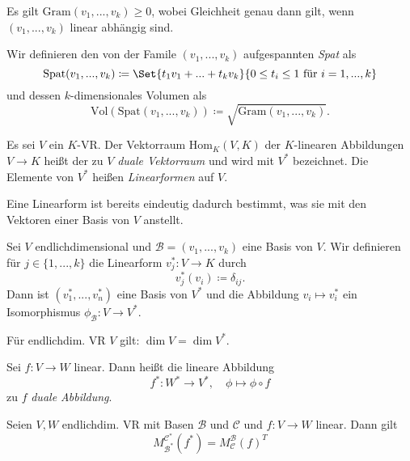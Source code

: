 \documentclass{cheat-sheet}
\newcommand{\Gram}{\mathrm{Gram}}
\newcommand{\Spat}{\mathrm{Spat}}
\newcommand{\Vol}{\mathrm{Vol}}
\newcommand{\Hom}{\mathrm{Hom}}
\newcommand{\BB}{\mathcal{B}}
\newcommand{\BC}{\mathcal{C}}
\begin{document}
\begin{satz}
Es gilt $\Gram(v_1, ..., v_k) \ge 0$, wobei Gleichheit genau dann gilt, wenn $(v_1, ..., v_k)$ linear abhängig sind.
\end{satz}

\begin{definition}
Wir definieren den von der Famile $(v_1, ..., v_k)$ aufgespannten \emph{Spat} als
\[ \Spat(v_1, ..., v_k) \coloneqq \Set{ t_1 v_1 + ... + t_k v_k }{ 0 \le t_i \le 1 \text{ für } i = 1, ..., k } \]
und dessen $k$-dimensionales Volumen als
\[ \Vol(\Spat(v_1, ..., v_k)) \coloneqq \sqrt{ \Gram(v_1, ..., v_k) }. \]
\end{definition}

\begin{definition}
Es sei $V$ ein $K$-VR. Der Vektorraum $\Hom_K(V, K)$ der $K$-linearen Abbildungen $V \to K$ heißt der zu $V$ \emph{duale Vektorraum} und wird mit $V^*$ bezeichnet. Die Elemente von $V^*$ heißen \emph{Linearformen} auf $V$.
\end{definition}

\begin{bem}
Eine Linearform ist bereits eindeutig dadurch bestimmt, was sie mit den Vektoren einer Basis von $V$ anstellt.
\end{bem}

\begin{satz}
Sei $V$ endlichdimensional und $\BB = (v_1, ..., v_k)$ eine Basis von $V$. Wir definieren für $j \in \{ 1, ..., k \}$ die Linearform $v_j^* : V \to K$ durch
\[ v_j^*(v_i) \coloneqq \delta_{ij}. \]
Dann ist $(v_1^*, ..., v_n^*)$ eine Basis von $V^*$ und die Abbildung $v_i \mapsto v_i^*$ ein Isomorphismus $\phi_{\BB} : V \to V^*$.
\end{satz}

\begin{kor}
Für endlichdim. VR $V$ gilt: $\dim V = \dim V^*$.
\end{kor}

\begin{definition}
Sei $f : V \to W$ linear. Dann heißt die lineare Abbildung
\[ f^* : W^* \to V^*, \quad \phi \mapsto \phi \circ f \]
zu $f$ \emph{duale Abbildung}.
\end{definition}

\begin{satz}
Seien $V, W$ endlichdim. VR mit Basen $\BB$ und $\BC$ und $f : V \to W$ linear. Dann gilt
\[ M_{\BB^*}^{\BC^*}(f^*) = M_{\BC}^{\BB}(f)^T \]
\end{satz}
\end{document}
